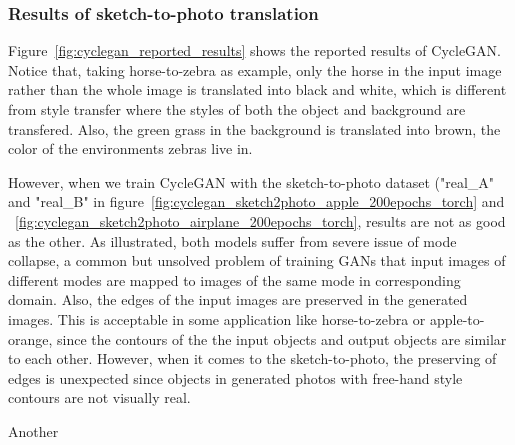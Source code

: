 \subsubsection{Results of sketch-to-photo translation}
Figure~\ref{fig:cyclegan_reported_results} shows the reported results of CycleGAN. Notice that, taking horse-to-zebra as example, only the horse in the input image rather than the whole image is translated into black and white, which is different from style transfer where the styles of both the object and background are transfered. Also, the green grass in the background is translated into brown, the color of the environments zebras live in.

However, when we train CycleGAN with the sketch-to-photo dataset ("real\_A" and "real\_B" in figure~\ref{fig:cyclegan_sketch2photo_apple_200epochs_torch} and ~\ref{fig:cyclegan_sketch2photo_airplane_200epochs_torch}, results are not as good as the other. As illustrated, both models suffer from severe issue of mode collapse, a common but unsolved problem of training GANs that input images of different modes are mapped to images of the same mode in corresponding domain. Also, the edges of the input images are preserved in the generated images. This is acceptable in some application like horse-to-zebra or apple-to-orange, since the contours of the the input objects and output objects are similar to each other. However, when it comes to the sketch-to-photo, the preserving of edges is unexpected since objects in generated photos with free-hand style contours are not visually real.

Another 
